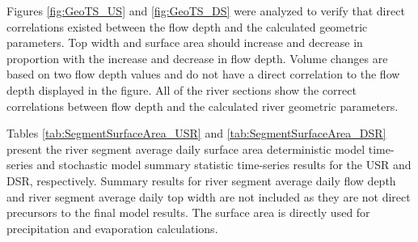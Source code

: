 \begin{linenumbers}
Figures \ref{fig:GeoTS_US} and \ref{fig:GeoTS_DS} were analyzed to verify that direct correlations existed between the flow depth and the calculated geometric parameters.  Top width and surface area should increase and decrease in proportion with the increase and decrease in flow depth.  Volume changes are based on two flow depth values and do not have a direct correlation to the flow depth displayed in the figure.  All of the river sections show the correct correlations between flow depth and the calculated river geometric parameters.

Tables \ref{tab:SegmentSurfaceArea_USR} and \ref{tab:SegmentSurfaceArea_DSR} present the river segment average daily surface area deterministic model time-series and stochastic model summary statistic time-series results for the USR and DSR, respectively.  Summary results for river segment average daily flow depth and river segment average daily top width are not included as they are not direct precursors to the final model results.  The surface area is directly used for precipitation and evaporation calculations.

\subtabletop
\begin{table}[htbp]
	\centering
	\caption[USR river segment surface area deterministic and stochastic model numerical results.]{USR river segment surface area deterministic and stochastic model numerical results.  Values are in hectares (\si{\hectare}) with values in parentheses in acres (\si{\acre}).}
	\label{tab:SegmentSurfaceArea_USR}
	\begin{subtable}{\textwidth}
		\centering
		
	\end{subtable}\\
	\tablevspace
	\begin{subtable}{\textwidth}
		\centering
		
	\end{subtable}\\
\end{table}

\subtablemid
\begin{table}[htbp]
	\centering
	\caption{USR river segment surface area deterministic and stochastic model numerical results.}
	\begin{subtable}{\textwidth}
		\centering
		
	\end{subtable}\\
	\tablevspace
	\begin{subtable}{\textwidth}
		\centering
		
	\end{subtable}\\
\end{table}


\end{linenumbers}
